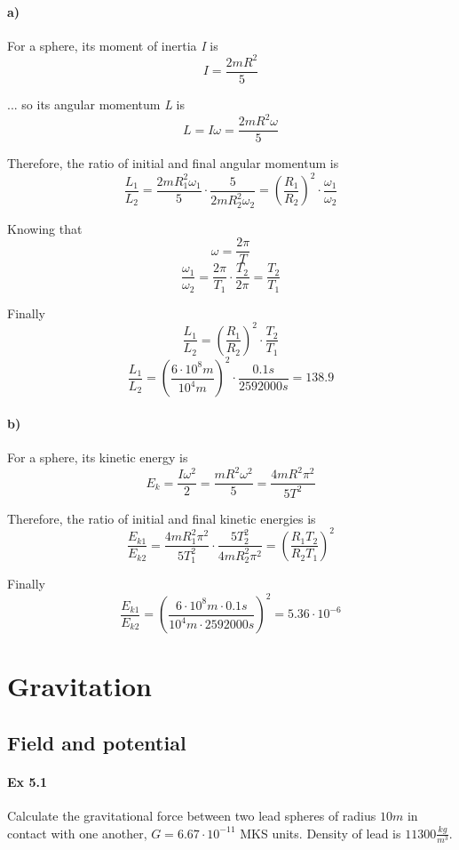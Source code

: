 \documentclass{article}
\begin{document}
\paragraph{a)}
For a sphere, its moment of inertia \textit{I} is
\[ I = \frac{2 m R^2}{5} \]

... so its angular momentum \textit{L} is
\[ L = I \omega = \frac{2 m R^2 \omega}{5} \]

Therefore, the ratio of initial and final angular momentum is
\[ \frac{L_1}{L_2} = 
\frac{2 m R_1^2 \omega_1}{5} \cdot \frac{5}{2 m R_2^2 \omega_2} =
\left( \frac{R_1}{R_2} \right)^2 \cdot \frac{\omega_1}{\omega_2} \]

Knowing that
\[ \omega = \frac{2 \pi}{T} \]
\[ \frac{\omega_1}{\omega_2} = \frac{2 \pi}{T_1} \cdot \frac{T_2}{2 \pi} = \frac{T_2}{T_1} \]

Finally
\[ \frac{L_1}{L_2} = \left( \frac{R_1}{R_2} \right)^2 \cdot \frac{T_2}{T_1} \]
\[ \frac{L_1}{L_2} = \left( \frac{6 \cdot 10^8 m}{10^4 m} \right)^2 \cdot \frac{0.1 s}{2592000 s} = 138.9 \]

\paragraph{b)}
For a sphere, its kinetic energy is
\[ E_k = \frac{I \omega^2}{2} = \frac{m R^2 \omega^2}{5} = \frac{4 m R^2 \pi^2 }{5 T^2} \]

Therefore, the ratio of initial and final kinetic energies is
\[ \frac{E_{k1}}{E_{k2}} = \frac{4 m R_1^2 \pi^2 }{5 T_1^2} \cdot \frac{5 T_2^2}{4 m R_2^2 \pi^2} = \left( \frac{R_1 T_2}{R_2 T_1} \right)^2 \]

Finally
\[ \frac{E_{k1}}{E_{k2}} = \left(  \frac{6 \cdot 10^8 m \cdot 0.1 s}{10^4 m \cdot 2592000 s} \right)^2 = 5.36 \cdot 10^{-6} \]


\section{Gravitation}
\subsection{Field and potential}


\paragraph{Ex 5.1}
Calculate the gravitational force between two lead spheres of radius $10 m$ in contact with one another, $G = 6.67 \cdot 10^{-11}$ MKS units. Density of lead is $11300 \frac{kg}{m^3}$.
\end{document}
